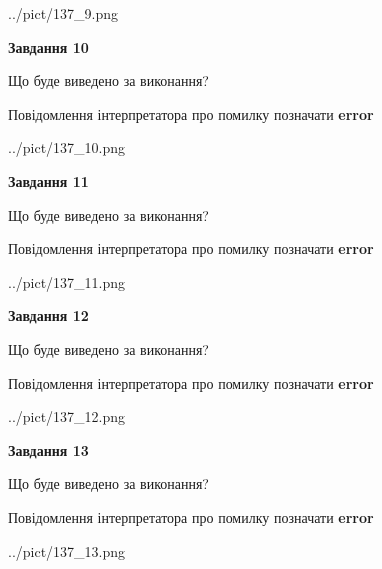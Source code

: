 \documentclass[11pt, ukrainian]{article}
\begin{document}
{\begin {large}
\begin{center}
	{../pict/137_9.png}
\end{center}
\newpage

{\begin {center}\textbf{Завдання 10}\end {center}}\par
Що буде виведено за виконання? \par
Повідомлення інтерпретатора про помилку позначати \textbf{error}

\begin{center}
	{../pict/137_10.png}
\end{center}
\newpage

{\begin {center}\textbf{Завдання 11}\end {center}}\par
Що буде виведено за виконання? \par
Повідомлення інтерпретатора про помилку позначати \textbf{error}

\begin{center}
	{../pict/137_11.png}
\end{center}
\newpage

{\begin {center}\textbf{Завдання 12}\end {center}}\par
Що буде виведено за виконання? \par
Повідомлення інтерпретатора про помилку позначати \textbf{error}

\begin{center}
	{../pict/137_12.png}
\end{center}
\newpage

{\begin {center}\textbf{Завдання 13}\end {center}}\par
Що буде виведено за виконання? \par
Повідомлення інтерпретатора про помилку позначати \textbf{error}

\begin{center}
	{../pict/137_13.png}
\end{center}
\newpage


\end{large}}
\end{document}
